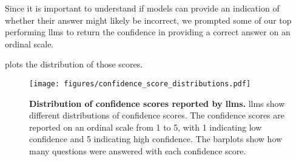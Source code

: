 Since it is important to understand if models can provide an indication of whether their answer might likely be incorrect, we prompted some of our top performing \glspl{llm} to return the confidence in providing a correct answer on an ordinal scale. 

 plots the distribution of those scores.

\begin{figure}[htb] 
    \centering
    \texttt{[image: figures/confidence\_score\_distributions.pdf]}
    \caption{\textbf{Distribution of confidence scores reported by \glspl{llm}.} \Glspl{llm} show different distributions of confidence scores. The confidence scores are reported on an ordinal scale from 1 to 5, with 1 indicating low confidence and 5 indicating high confidence. The barplots show how many questions were answered with each confidence score.}
    \label{fig:confidence_score_distributions}
\end{figure}


\clearpage

\printnoidxglossary[type=\acronymtype, nonumberlist]  %